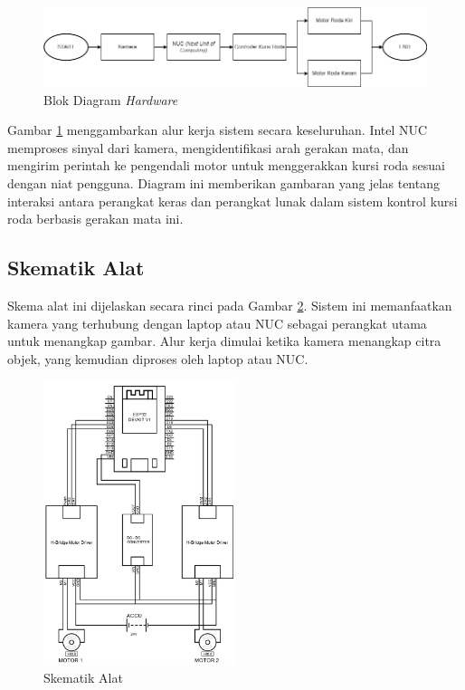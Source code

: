 \begin{figure} [ht] \centering
  \includegraphics[scale=0.5]{gambar/bab3/hardware.png}
  \caption{Blok Diagram \textit{Hardware}}
  \label{fig:hardware}
\end{figure}

Gambar \ref{fig:hardware} menggambarkan alur kerja sistem secara keseluruhan. Intel NUC memproses sinyal dari kamera, mengidentifikasi arah gerakan mata, dan mengirim perintah ke pengendali motor untuk menggerakkan kursi roda sesuai dengan niat pengguna. Diagram ini memberikan gambaran yang jelas tentang interaksi antara perangkat keras dan perangkat lunak dalam sistem kontrol kursi roda berbasis gerakan mata ini.

\subsection{Skematik Alat}
\label{sec:skematik}

Skema alat ini dijelaskan secara rinci pada Gambar \ref{fig:Skematik Alat}. Sistem ini memanfaatkan kamera yang terhubung dengan laptop atau NUC sebagai perangkat utama untuk menangkap gambar. Alur kerja dimulai ketika kamera menangkap citra objek, yang kemudian diproses oleh laptop atau NUC. 

\begin{figure} [H] \centering
  \includegraphics[width=0.5\textwidth]{gambar/bab3/Schematics.png}
  \caption{Skematik Alat}
  \label{fig:Skematik Alat}
\end{figure}

